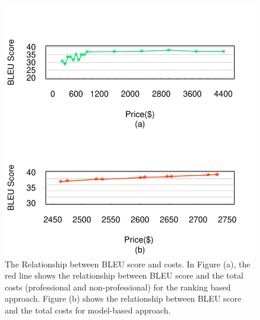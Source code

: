 \documentclass[11pt,letterpaper]{article}
\begin{document}

\begin{figure}[htbp]
  \centering
  \includegraphics[width=\linewidth]{cost-bleu/pricecost.pdf}
  \caption{The Relationship between BLEU score and costs. In Figure (a), the red line shows the relationship between BLEU score and  the total costs (professional and non-professional) for the ranking based approach. 
  Figure (b) shows the relationship between BLEU score and the total costs for model-based approach. 
  }
    \label{fbleucost}
\end{figure}
\end{document}
